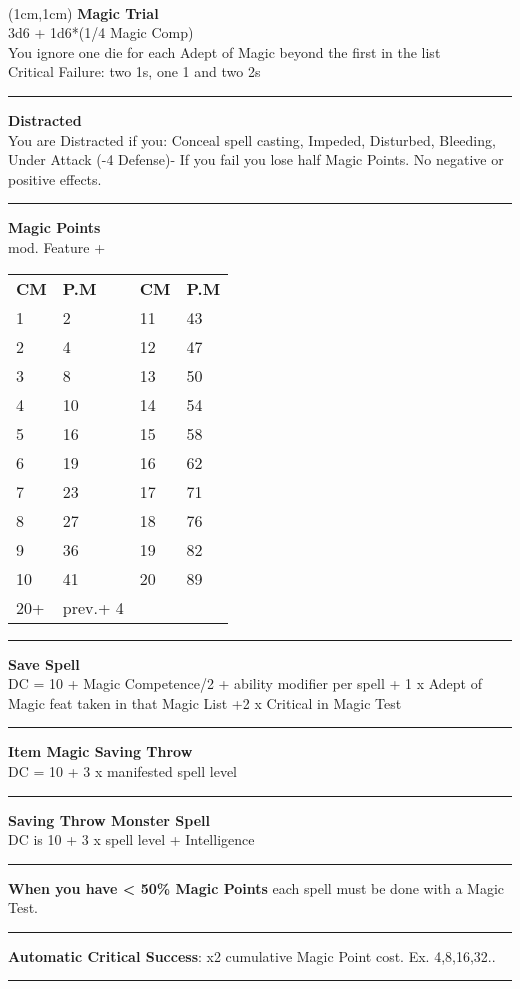 \documentclass[a4paper,12 pt,openany]{book}
\newcommand{\linex}{\rule{\textwidth}{0.4pt}}
\begin{document}
~\newpage

\begin{textblock*}{5cm}(1cm,1cm) %
\textbf{Magic Trial}\\
3d6 + 1d6*(1/4 Magic Comp)\\
You ignore one die for each Adept of Magic beyond the first in the list\\
Critical Failure: two 1s, one 1 and two 2s\\


\linex

\textbf{Distracted}\\
You are Distracted if you: Conceal spell casting, Impeded, Disturbed, Bleeding, Under Attack (-4 Defense)-
If you fail you lose half Magic Points. No negative or positive effects.\\

\linex

\textbf{Magic Points}\\
mod. Feature + \\

\begin{tabular}{ll|ll}
\textbf{CM} & \textbf{P.M}& \textbf{CM} & \textbf{P.M}\\
	1&	2 	&11&43\\
2&	4	&12&47\\
3&	8	&13&50\\
4&	10	&14&54\\
5&	16	&15&58\\
6&	19	&16&62\\
7&	23	&17&71\\
8&	27	&18&76\\
9&	36	&19&82\\
10&	41	&20&89\\
20+&prev.+ 4&&\\
\end{tabular}

\linex

\textbf{Save Spell}\\
DC = 10 + Magic Competence/2 + ability modifier per spell + 1 x Adept of Magic feat taken in that Magic List +2 x Critical in Magic Test

\linex

\textbf{Item Magic Saving Throw}\\
DC = 10 + 3 x manifested spell level

\linex

\textbf{Saving Throw Monster Spell}\\
DC is 10 + 3 x spell level + Intelligence

\linex

\textbf{When you have < 50\% Magic Points} each spell must be done with a Magic Test.

\linex

\textbf{Automatic Critical Success}: x2 cumulative Magic Point cost. Ex. 4,8,16,32..

\linex

\end{textblock*}
\end{document}
